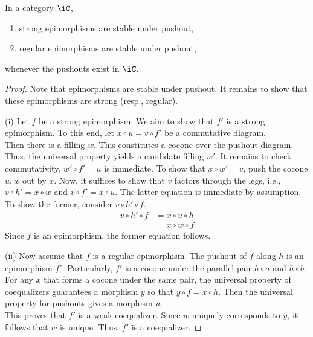 \documentclass{amsart}
\begin{document}
\begin{prop}
  In a category $\iC$,
  \begin{enumerate}
  \item strong epimorphisms are stable under pushout,
  \item regular epimorphisms are stable under pushout,
  \end{enumerate}
  whenever the pushouts exist in $\iC$.
\end{prop}
\begin{proof}
  Note that epimorphisms are stable under pushout.
  It remains to show that these epimorphisms are strong (resp., regular).

  (i) Let $f$ be a strong epimorphism.
  We aim to show that $f'$ is a strong epimorphism.
  To this end, let $x \circ u = v \circ f'$ be a commutative diagram.
  \[\]
  Then there is a filling $w$.
  This constitutes a cocone over the pushout diagram.
  Thus, the universal property yields a candidate filling $w'$.
  It remains to check commutativity.
  $w' \circ f' = u$ is immediate.
  To show that $x \circ w' = v$, push the cocone $u,w$ out by $x$.
  Now, it suffices to show that $v$ factors through the legs, i.e., $v \circ h' = x \circ w$ and $v \circ f' = x \circ u$.
  The latter equation is immediate by assumption.
  To show the former, consider $v \circ h' \circ f$.
  \begin{align}
    v \circ h' \circ f &= x \circ u \circ h\\
               &= x \circ w \circ f
  \end{align}
  Since $f$ is an epimorphism, the former equation follows.

  (ii) Now assume that $f$ is a regular epimorphism.
  The pushout of $f$ along $h$ is an epimorphism $f'$.
  Particularly, $f'$ is a cocone under the parallel pair $h \circ a$ and $h \circ b$.
  For any $x$ that forms a cocone under the same pair, the universal property of coequalizers guarantees a morphism $y$ so that $y \circ f = x \circ h$.
  Then the universal property for pushouts gives a morphism $w$.
  \[\]
  This proves that $f'$ is a weak coequalizer.
  Since $w$ uniquely corresponds to $y$, it follows that $w$ is unique.
  Thus, $f'$ is a coequalizer.
\end{proof}
\end{document}
